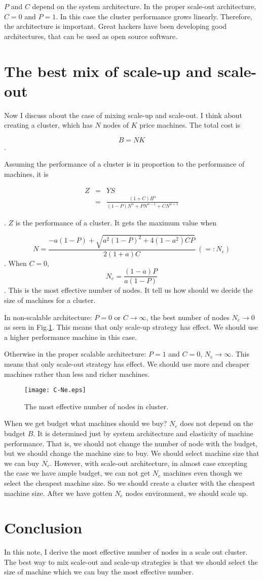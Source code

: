 \documentclass[a4paper,11pt]{article}
\begin{document}
$P$ and $C$ depend on the system architecture. In the proper scale-out architecture, $C = 0$ and $P = 1$.
In this case the cluster performance grows linearly.
Therefore, the architecture is important.
Great hackers have been developing good architectures,
that can be used as open source software.

\section{The best mix of scale-up and scale-out}

Now I discuss about the case of mixing scale-up and scale-out. I think about creating a cluster, which has $N$ nodes of $K$ price machines. The total cost is 

$$
B = NK
$$
.

Assuming the performance of a cluster is in proportion to the performance of machines, it is

\begin{eqnarray*}
Z &=& YS\\
  &=&\frac{(1 + C) B^\alpha}{(1-P) N^\alpha + P N^{\alpha-1} + C N^{\alpha + 1}}
\end{eqnarray*}

. $Z$ is the performance of a cluster. It gets the maximum value when

$$
N = \frac{-a(1-P)+\sqrt{a^2(1-P)^2 + 4(1-a^2)CP}}{2(1+a)C} ~ ( =: N_e)
$$
. When $C=0$,
$$
N_e = \frac{(1-a)P}{a(1-P)}
$$
. This is the most effective number of nodes. 
It tell us how should we decide the size of machines for a cluster. 

In non-scalable architecture: $P=0$ or $C \to \infty$, the best number of nodes 
$N_e \to 0$ as seen in Fig.\ref{C-Ne}. This means that only scale-up strategy has effect. We should use a higher performance machine in this case.

Otherwise in the proper scalable architecture: $P=1$ and $C = 0$, $N_e \to \infty$.
This means that only scale-out strategy has effect.
We should use more and cheaper machines rather than less and richer machines.

\begin{figure}
\begin{center}
\texttt{[image: C-Ne.eps]}
\caption{The most effective number of nodes in cluster.}
\label{C-Ne}
\end{center}
\end{figure}

When we get budget what machines should we buy?
$N_e$ does not depend on the budget $B$.
It is determined just by system architecture and elasticity of machine performance.
That is, we should not change the number of node with the budget,
but we should change the machine size to buy.
We should select machine size that we can buy $N_e$.
However, with scale-out architecture, in almost case excepting the case we have ample budget, we can not get $N_e$ machines even though we select the cheapest machine size.
So we should create a cluster with the cheapest machine size.
After we have gotten $N_e$ nodes environment, we should scale up.

\section{Conclusion}

In this note, I derive the most effective number of nodes in a scale out cluster. The best way to mix scale-out and scale-up strategies is that we should select the size of machine which we can buy the most effective number.
\end{document}
